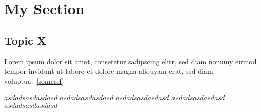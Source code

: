 \documentclass{article}
\begin{document}
\section{My Section}


\subsection{Topic X}

Lorem ipsum dolor sit amet, consetetur sadipscing elitr, sed diam nonumy eirmod tempor invidunt ut labore et dolore magna aliquyam erat, sed diam voluptua.~\ref{someref}

$asdadsasdasdasd$ $asdadsasdasdasd$ $asdadsasdasdasd$ $asdadsasdasdasd$ $asdadsasdasdasd$


\end{document}
